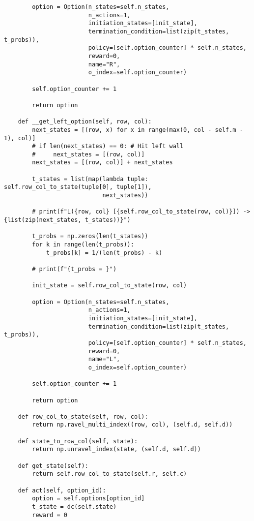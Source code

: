 \begin{verbatim}
        option = Option(n_states=self.n_states,
                        n_actions=1,
                        initiation_states=[init_state],
                        termination_condition=list(zip(t_states, t_probs)),
                        policy=[self.option_counter] * self.n_states,
                        reward=0,
                        name="R",
                        o_index=self.option_counter)

        self.option_counter += 1

        return option

    def __get_left_option(self, row, col):
        next_states = [(row, x) for x in range(max(0, col - self.m - 1), col)]
        # if len(next_states) == 0: # Hit left wall
        #     next_states = [(row, col)]
        next_states = [(row, col)] + next_states

        t_states = list(map(lambda tuple: self.row_col_to_state(tuple[0], tuple[1]),
                            next_states))

        # print(f"L({row, col} [{self.row_col_to_state(row, col)}]) -> {list(zip(next_states, t_states))}")

        t_probs = np.zeros(len(t_states))
        for k in range(len(t_probs)):
            t_probs[k] = 1/(len(t_probs) - k)

        # print(f"{t_probs = }")

        init_state = self.row_col_to_state(row, col)

        option = Option(n_states=self.n_states,
                        n_actions=1,
                        initiation_states=[init_state],
                        termination_condition=list(zip(t_states, t_probs)),
                        policy=[self.option_counter] * self.n_states,
                        reward=0,
                        name="L",
                        o_index=self.option_counter)

        self.option_counter += 1

        return option

    def row_col_to_state(self, row, col):
        return np.ravel_multi_index((row, col), (self.d, self.d))

    def state_to_row_col(self, state):
        return np.unravel_index(state, (self.d, self.d))

    def get_state(self):
        return self.row_col_to_state(self.r, self.c)

    def act(self, option_id):
        option = self.options[option_id]
        t_state = dc(self.state)
        reward = 0


\end{verbatim}
